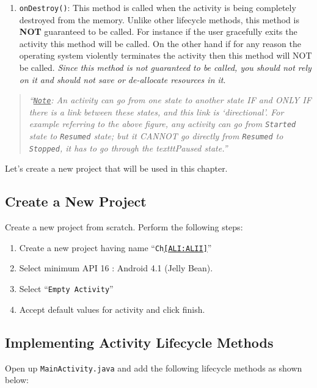 \begin{enumerate}
	\item \texttt{onDestroy()}: This method is called when the activity is being completely destroyed from the memory. Unlike other lifecycle methods, this method is \textbf{NOT} guaranteed to be called. For instance if the user gracefully exits the activity this method will be called. On the other hand if for any reason the operating system violently terminates the activity then this method will NOT be called. \textit{Since this method is not guaranteed to be called, you should not rely on it and should not save or de-allocate resources in it}. 
	
\end{enumerate}

\begin{quotation}
	\textit{``\texttt{\underline{Note}}: An activity can go from one state to another state IF and ONLY IF there is a link between these states, and this link is `directional'. For example referring to the above figure, any activity can go from \texttt{Started} state to \texttt{Resumed} state; but it CANNOT go directly from \texttt{Resumed} to \texttt{Stopped}, it has to go through the texttt{Paused} state.''}
\end{quotation}

Let's create a new project that will be used in this chapter.

\subsection{Create a New Project}
\label{ALI:createProj}

Create a new project from scratch. Perform the following steps:
\begin{enumerate}
	\item Create a new project having name ``\texttt{Ch\ref{ALI:ALII}}''
	\item Select minimum API 16 : Android 4.1 (Jelly Bean).
	\item Select ``\texttt{Empty Activity}''
	\item Accept default values for activity and click finish. \\
\end{enumerate}

\subsection{Implementing Activity Lifecycle Methods}
Open up \texttt{MainActivity.java} and add the following lifecycle methods as shown below:

